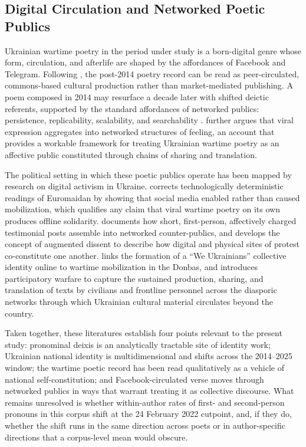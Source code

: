 \documentclass[12pt]{interact}
\theoremstyle{plain}%
\theoremstyle{definition}
\theoremstyle{remark}
\begin{document}
\subsection{Digital Circulation and Networked Poetic Publics}

Ukrainian wartime poetry in the period under study is a born-digital genre whose form, circulation, and afterlife are shaped by the affordances of Facebook and Telegram. Following \citet{benkler2018network}, the post-2014 poetry record can be read as peer-circulated, commons-based cultural production rather than market-mediated publishing. A poem composed in 2014 may resurface a decade later with shifted deictic referents, supported by the standard affordances of networked publics: persistence, replicability, scalability, and searchability \citep{papacharissi2015affective}. \citet{papacharissi2015affective} further argues that viral expression aggregates into networked structures of feeling, an account that provides a workable framework for treating Ukrainian wartime poetry as an affective public constituted through chains of sharing and translation.

The political setting in which these poetic publics operate has been mapped by research on digital activism in Ukraine. \citet{onuch2022the} corrects technologically deterministic readings of Euromaidan by showing that social media enabled rather than caused mobilization, which qualifies any claim that viral wartime poetry on its own produces offline solidarity. \citet{lokot2018iamnotafraidtosayi, lokot2021beyond} documents how short, first-person, affectively charged testimonial posts assemble into networked counter-publics, and develops the concept of augmented dissent to describe how digital and physical sites of protest co-constitute one another. \citet{boichak2020between} links the formation of a ``We Ukrainians'' collective identity online to wartime mobilization in the Donbas, and \citet{boichak2022mapping} introduces participatory warfare to capture the sustained production, sharing, and translation of texts by civilians and frontline personnel across the diasporic networks through which Ukrainian cultural material circulates beyond the country.

Taken together, these literatures establish four points relevant to the present study: pronominal deixis is an analytically tractable site of identity work; Ukrainian national identity is multidimensional and shifts across the 2014--2025 window; the wartime poetic record has been read qualitatively as a vehicle of national self-constitution; and Facebook-circulated verse moves through networked publics in ways that warrant treating it as collective discourse. What remains unresolved is whether within-author rates of first- and second-person pronouns in this corpus shift at the 24 February 2022 cutpoint, and, if they do, whether the shift runs in the same direction across poets or in author-specific directions that a corpus-level mean would obscure.
\end{document}
